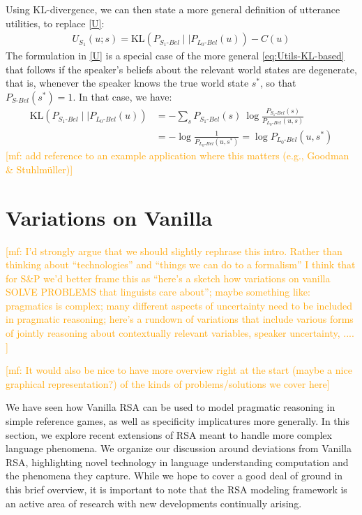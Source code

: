 \documentclass{sp}
\newcommand{\mf}[1]{\textcolor{orange}{[mf: #1]}}
\begin{document}
Using KL-divergence, we can then state a more general definition of utterance utilities, to
replace \eqref{U}:
\begin{align}
  \label{eq:Utils-KL-based}
  U_{S_1}(u; s) = \text{KL}(P_{S_{1}\text{-}Bel} \mid \mid P_{L_{0}\text{-}Bel}(u)) - C(u)
\end{align}
The formulation in \eqref{U} is a special case of the more general \eqref{eq:Utils-KL-based}
that follows if the speaker's beliefs about the relevant world states are degenerate, that is,
whenever the speaker knows the true world state $s^{*}$, so that $P_{S\text{-}Bel}(s^{*})=1$.
In that case, we have:
\begin{align*}
  \text{KL}(P_{S_{1}\text{-}Bel} \mid \mid P_{L_{0}\text{-}Bel}(u)) & = - \sum_{s} P_{S_{1}\text{-}Bel}(s) \ \log \frac{P_{S_{1}\text{-}Bel}(s)}{P_{L_{0}\text{-}Bel}(u,s)} \\
  & =  - \log\frac{1}{P_{L_{0}\text{-}Bel}(u,s^*)} = \log P_{L_{0}\text{-}Bel}(u,s^*)
\end{align*}
\mf{add reference to an example application where this matters (e.g., Goodman \& Stuhlm\"uller)}

\section{Variations on Vanilla} \label{variations}

\mf{I'd strongly argue that we should slightly rephrase this intro. Rather than thinking about ``technologies'' and ``things we can do to a formalism'' I think that for S\&P we'd better frame this as ``here's a sketch how variations on vanilla SOLVE PROBLEMS that linguists care about''; maybe something like: pragmatics is complex; many different aspects of uncertainty need to be included in pragmatic reasoning; here's a rundown of variations that include various forms of jointly reasoning about contextually relevant variables, speaker uncertainty, .... }

\mf{It would also be nice to have more overview right at the start (maybe a nice graphical representation?) of the kinds of problems/solutions we cover here}

We have seen how Vanilla RSA can be used to model pragmatic reasoning in simple reference games, as well as specificity implicatures more generally. In this section, we explore recent extensions of RSA meant to handle more complex language phenomena. We organize our discussion around deviations from Vanilla RSA, highlighting novel technology in language understanding computation and the phenomena they capture. While we hope to cover a good deal of ground in this brief overview, it is important to note that the RSA modeling framework is an active area of research with new developments continually arising.
\end{document}
